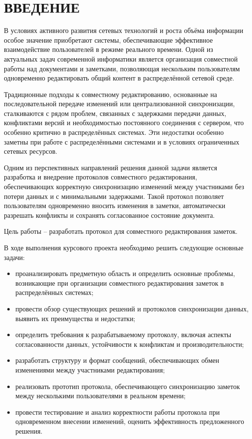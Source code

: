 \maketableofcontents

\chapter*{\textbf{ВВЕДЕНИЕ}}

В условиях активного развития сетевых технологий и роста объёма информации особое значение приобретают системы, обеспечивающие эффективное взаимодействие пользователей в режиме реального времени. 
Одной из актуальных задач современной информатики является организация совместной работы над документами и заметками, позволяющая нескольким пользователям одновременно редактировать общий контент в распределённой сетевой среде.

Традиционные подходы к совместному редактированию, основанные на последовательной передаче изменений или централизованной синхронизации, сталкиваются с рядом проблем, связанных с задержками передачи данных, конфликтами версий и необходимостью постоянного соединения с сервером, что особенно критично в распределённых системах.
Эти недостатки особенно заметны при работе с распределёнными системами и в условиях ограниченных сетевых ресурсов.

Одним из перспективных направлений решения данной задачи является разработка и внедрение протоколов совместного редактирования, обеспечивающих корректную синхронизацию изменений между участниками без потери данных и с минимальными задержками. 
Такой протокол позволяет пользователям одновременно вносить изменения в заметки, автоматически разрешать конфликты и сохранять согласованное состояние документа.

Цель работы – разработать протокол для совместного редактирования заметок.

В ходе выполнения курсового проекта необходимо решить следующие основные задачи:

\begin{itemize}
	\item проанализировать предметную область и определить основные проблемы, возникающие при организации совместного редактирования заметок в распределённых системах;
	\item провести обзор существующих решений и протоколов синхронизации данных, выявить их преимущества и недостатки;
	\item определить требования к разрабатываемому протоколу, включая аспекты согласованности данных, устойчивости к конфликтам и производительности;
    \item разработать структуру и формат сообщений, обеспечивающих обмен изменениями между участниками редактирования;
    \item реализовать прототип протокола, обеспечивающего синхронизацию заметок между несколькими пользователями в реальном времени;
    \item провести тестирование и анализ корректности работы протокола при одновременном внесении изменений, оценить эффективность предложенного решения.
\end{itemize}